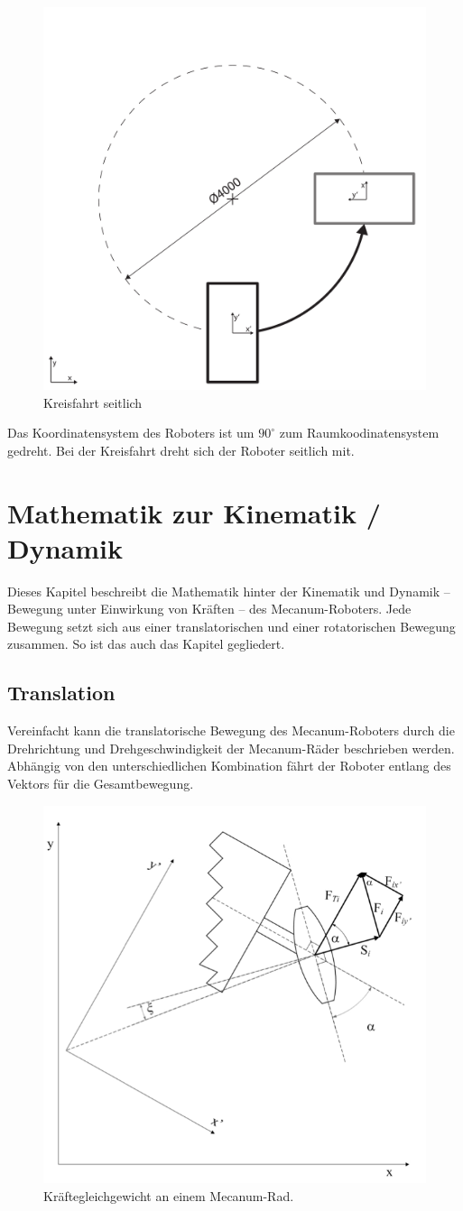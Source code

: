 \documentclass[a4paper]{article}
\begin{document}
\begin{figure}[H]
    \centering
    \includegraphics[width=.6\textwidth]{Viertelkreis-seitwaerts}
    \caption{Kreisfahrt seitlich}
    \label{fig:kreis-seitwaerts}
\end{figure}
Das Koordinatensystem des Roboters ist um $90^\circ$ zum Raumkoodinatensystem gedreht. Bei der Kreisfahrt dreht sich der Roboter seitlich mit.


\section{Mathematik zur Kinematik / Dynamik}
Dieses Kapitel beschreibt die Mathematik hinter der Kinematik und Dynamik -- Bewegung unter Einwirkung von Kräften -- des Mecanum-Roboters. Jede Bewegung setzt sich aus einer translatorischen und einer rotatorischen Bewegung zusammen. So ist das auch das Kapitel gegliedert.

\subsection{Translation}
Vereinfacht kann die translatorische Bewegung des Mecanum-Roboters durch die Drehrichtung und Drehgeschwindigkeit der Mecanum-Räder beschrieben werden. Abhängig von den unterschiedlichen Kombination fährt der Roboter entlang des Vektors für die Gesamtbewegung.
\begin{figure}[H]
    \centering
    \includegraphics[width=.6\textwidth]{Kraefte-am-Rad}
    \caption{Kräftegleichgewicht an einem Mecanum-Rad.}
\end{figure}
\end{document}
